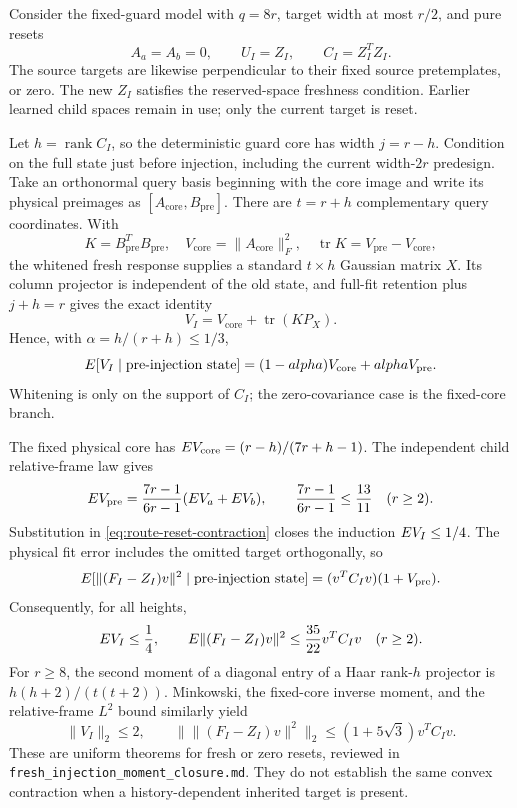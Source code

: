 \documentclass[11pt,oneside,openany,a4paper]{report}
\numberwithin{equation}{chapter}
\theoremstyle{definition}
\theoremstyle{remark}
\newcommand{\sourcefile}[1]{{\small\nolinkurl{#1}}}
\DeclareMathOperator{\tr}{tr}\DeclareMathOperator{\rank}{rank}
\begin{document}
Consider the fixed-guard model with $q=8r$, target width at most $r/2$,
and pure resets
\[
 A_a=A_b=0,\qquad U_I=Z_I,\qquad C_I=Z_I^TZ_I.
\]
The source targets are likewise perpendicular to their fixed source
pretemplates, or zero.  The new $Z_I$ satisfies the reserved-space
freshness condition.  Earlier learned child spaces remain in use; only
the current target is reset.

Let $h=\rank C_I$, so the deterministic guard core has width $j=r-h$.
Condition on the full state just before injection, including the
current width-$2r$ predesign.  Take an orthonormal query basis beginning
with the core image and write its physical preimages as
$[A_{\mathrm{core}},B_{\mathrm{pre}}]$.  There are $t=r+h$
complementary query coordinates.  With
\[
 K=B_{\mathrm{pre}}^TB_{\mathrm{pre}},\quad
 V_{\mathrm{core}}=\lVert A_{\mathrm{core}}\rVert_F^2,
 \quad \tr K=V_{\mathrm{pre}}-V_{\mathrm{core}},
\]
the whitened fresh response supplies a standard $t\times h$ Gaussian
matrix $X$.  Its column projector is independent of the old state, and
full-fit retention plus $j+h=r$ gives the exact identity
\begin{equation}
 V_I=V_{\mathrm{core}}+\tr(KP_X).
 \label{eq:route-reset-projector}
\end{equation}
Hence, with $\alpha=h/(r+h)\leq1/3$,
\begin{equation}
 E[V_I\mid\text{pre-injection state}]
 =(1-alpha)V_{\mathrm{core}}+alpha V_{\mathrm{pre}}.
 \label{eq:route-reset-contraction}
\end{equation}
Whitening is only on the support of $C_I$; the zero-covariance case is
the fixed-core branch.

The fixed physical core has
$E V_{\mathrm{core}}=(r-h)/(7r+h-1)$.  The independent child
relative-frame law gives
\[
 E V_{\mathrm{pre}}
 =\frac{7r-1}{6r-1}(E V_a+E V_b),
 \qquad\frac{7r-1}{6r-1}\leq\frac{13}{11}\quad(r\geq2).
\]
Substitution in \eqref{eq:route-reset-contraction} closes the induction
$E V_I\leq1/4$.  The physical fit error includes the omitted target
orthogonally, so
\[
 E[\lVert(F_I-Z_I)v\rVert^2\mid\text{pre-injection state}]
 =(v^TC_Iv)(1+V_{\mathrm{pre}}).
\]
Consequently, for all heights,
\begin{equation}
 E V_I\leq\frac14,\qquad
 E\lVert(F_I-Z_I)v\rVert^2\leq\frac{35}{22}v^TC_Iv
 \quad(r\geq2).
 \label{eq:route-reset-mean}
\end{equation}
For $r\geq8$, the second moment of a diagonal entry of a Haar rank-$h$
projector is $h(h+2)/(t(t+2))$.  Minkowski, the fixed-core inverse
moment, and the relative-frame $L^2$ bound similarly yield
\begin{equation}
 \|V_I\|_2\leq2,\qquad
 \|\lVert(F_I-Z_I)v\rVert^2\|_2
 \leq(1+5\sqrt3)v^TC_Iv.
 \label{eq:route-reset-second}
\end{equation}
These are uniform theorems for fresh or zero resets, reviewed in
\sourcefile{fresh_injection_moment_closure.md}.  They do not establish
the same convex contraction when a history-dependent inherited target
is present.
\end{document}
